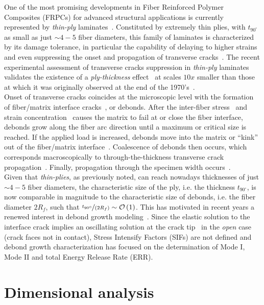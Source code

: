 \documentclass[a4paper,fleqn]{cas-dc}
\begin{document}
One of the most promising developments in Fiber Reinforced Polymer Composites (FRPCs) for advanced structural applications is currently represented by \emph{thin-ply} laminates~\cite{Kopp2017}. Constituted by extremely thin plies, with $t_{90^{\circ}}$ as small as just $\sim4-5$ fiber diameters, this family of laminates is characterized by its damage tolerance, in particular the capability of delaying to higher strains and even suppressing the onset and propagation of transverse cracks~\cite{Cugnoni2018}. The recent experimental assessment of transverse cracks suppression in \emph{thin-ply} laminates~\cite{Sasayama2003,Saito2012,Amacher2014} validates the existence of a \emph{ply-thickness} effect~\cite{Amacher2014} at scales $10x$ smaller than those at which it was originally observed at the end of the 1970's~\cite{Bailey1979}.\\
Onset of transverse cracks coincides at the microscopic level with the formation of fiber/matrix interface cracks~\cite{Bailey1981}, or debonds. After the inter-fiber stress~\cite{Asp1996} and strain concentration~\cite{Kies1962} causes the matrix to fail at or close the fiber interface, debonds grow along the fiber arc direction until a maximum or critical size is reached. If the applied load is increased, debonds move into the matrix or ``kink'' out of the fiber/matrix interface~\cite{Zhang1997,Paris2007}. Coalescence of debonds then occurs, which corresponds macroscopically to through-the-thickness transverse crack propagation~\cite{Zhang1997,Zhuang2018}. Finally, propagation through the specimen width occurs~\cite{Zhang1997}.\\
Given that \emph{thin-plies}, as previously noted, can reach nowadays thicknesses of just $\sim4-5$ fiber diameters, the characteristic size of the ply, i.e. the thickness $t_{90^{\circ}}$, is now comparable in magnitude to the characteristic size of debonds, i.e. the fiber diameter $2R_{f}$, such that $\nicefrac{t_{90^{\circ}}}{\left(2R_{f}\right)}\sim\mathcal{O}\left(1\right)$. This has motivated in recent years a renewed interest in debond growth modeling~\cite{Zhuang2018,Sandino2016,Varna2017,Sandino2018}. Since the elastic solution to the interface crack implies an oscillating solution at the crack tip~\cite{Comninou1977} in the \emph{open} case (crack faces not in contact), Stress Intensify Factors (SIFs) are not defined and debond growth characterization has focused on the determination of Mode I, Mode II and total Energy Release Rate (ERR).

\section{Dimensional analysis}
\end{document}
